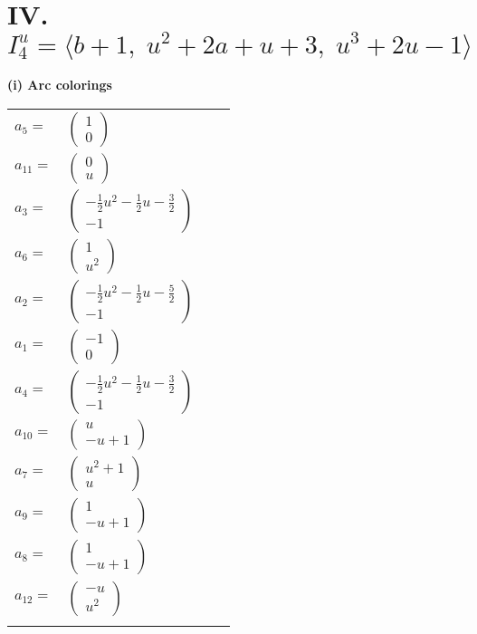 \documentclass[1p]{elsarticle_modified}
\theoremstyle{definition}
\begin{document}
\centering \section*{IV. $I^u_{4}= \langle b+1,\;u^2+2 a+u+3,\;u^3+2 u-1 \rangle$}
\flushleft \textbf{(i) Arc colorings}\\
\begin{tabular}{m{7pt} m{180pt} m{7pt} m{180pt} }
\flushright $a_{5}=$&$\begin{pmatrix}1\\0\end{pmatrix}$ \\
\flushright $a_{11}=$&$\begin{pmatrix}0\\u\end{pmatrix}$ \\
\flushright $a_{3}=$&$\begin{pmatrix}-\frac{1}{2} u^2-\frac{1}{2} u-\frac{3}{2}\\-1\end{pmatrix}$ \\
\flushright $a_{6}=$&$\begin{pmatrix}1\\u^2\end{pmatrix}$ \\
\flushright $a_{2}=$&$\begin{pmatrix}-\frac{1}{2} u^2-\frac{1}{2} u-\frac{5}{2}\\-1\end{pmatrix}$ \\
\flushright $a_{1}=$&$\begin{pmatrix}-1\\0\end{pmatrix}$ \\
\flushright $a_{4}=$&$\begin{pmatrix}-\frac{1}{2} u^2-\frac{1}{2} u-\frac{3}{2}\\-1\end{pmatrix}$ \\
\flushright $a_{10}=$&$\begin{pmatrix}u\\- u+1\end{pmatrix}$ \\
\flushright $a_{7}=$&$\begin{pmatrix}u^2+1\\u\end{pmatrix}$ \\
\flushright $a_{9}=$&$\begin{pmatrix}1\\- u+1\end{pmatrix}$ \\
\flushright $a_{8}=$&$\begin{pmatrix}1\\- u+1\end{pmatrix}$ \\
\flushright $a_{12}=$&$\begin{pmatrix}- u\\u^2\end{pmatrix}$\\&\end{tabular}
\end{document}
